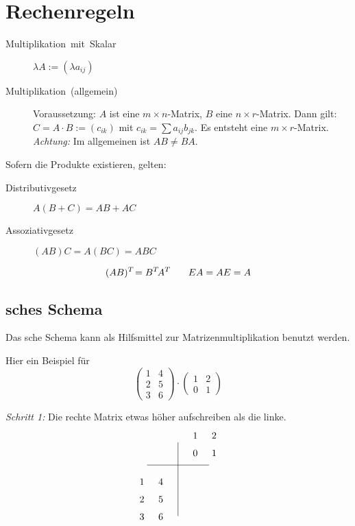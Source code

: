 \section{Rechenregeln}
\begin{description}
  \item [{Multiplikation~mit~Skalar}]
	$\lambda A:=(\lambda a_{ij})$
  \item [{Multiplikation~(allgemein)}]
	Voraussetzung: $A$ ist eine $m\times n$-Matrix, $B$ eine $n\times r$-Matrix.
	Dann gilt: $C=A\cdot B:=(c_{ik})$ mit $c_{ik}=\sum a_{ij} b_{jk}$.
	Es entsteht eine $m\times r$-Matrix.
	\emph{Achtung:} Im allgemeinen ist $AB\neq BA$.
\end{description}

Sofern die Produkte existieren, gelten:
\begin{description}
  \item [{Distributivgesetz}] 
	$A(B+C)=AB+AC$
  \item [{Assoziativgesetz}] 
	$(AB)C=A(BC)=ABC$
\end{description}
\[
    (AB)\T=B\T A\T \qquad EA=AE=A
\]

\subsection{\protect{}sches Schema}

Das sche Schema kann als Hilfsmittel zur Matrizenmultiplikation benutzt werden.

Hier ein Beispiel für 
\[
\begin{pmatrix}
  1 & 4\\
  2 & 5\\
  3 & 6
\end{pmatrix}
\cdot
\begin{pmatrix}
  1 & 2\\
  0 & 1
\end{pmatrix}
\]


\vbox{
\emph{Schritt 1:} Die rechte Matrix etwas höher aufschreiben als die linke.
\[
\begin{tikzcd}[sep=tiny]
                     &   & \,\arrow[ddddd, dash] & 1 & 2 \\
                     &   &                       & 0 & 1 \\
\,\arrow[rrrr, dash] &   &                       &   & \,\\
                   1 & 4\\
                   2 & 5\\
                   3 & 6 & \,
\end{tikzcd}
\]
}

